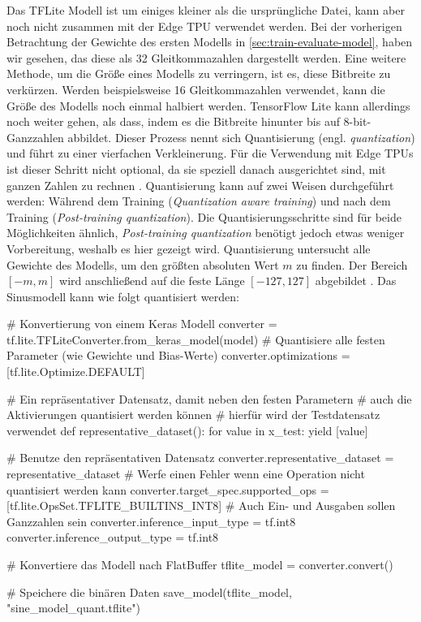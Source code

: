 Das TFLite Modell ist um einiges kleiner als die ursprüngliche Datei,
kann aber noch nicht zusammen mit der Edge TPU verwendet werden.
Bei der vorherigen Betrachtung der Gewichte des ersten Modells
in \autoref{sec:train-evaluate-model}, haben wir gesehen, das
diese als \qty{32}{\bit} Gleitkommazahlen dargestellt werden.
Eine weitere Methode, um die Größe eines Modells zu verringern,
ist es, diese Bitbreite zu verkürzen.
Werden beispielsweise \qty{16}{\bit} Gleitkommazahlen verwendet,
kann die Größe des Modells noch einmal halbiert werden.
TensorFlow Lite kann allerdings noch weiter gehen, als dass, indem es die
Bitbreite hinunter bis auf 8-bit-Ganzzahlen abbildet.
Dieser Prozess nennt sich Quantisierung
(engl. \textit{quantization}) und führt zu einer vierfachen Verkleinerung.
Für die Verwendung mit Edge TPUs ist dieser Schritt nicht optional,
da sie speziell danach ausgerichtet sind,
mit ganzen Zahlen zu rechnen \parencite{online:models-on-edge-tpu}.
Quantisierung kann auf zwei Weisen durchgeführt werden:
Während dem Training (\textit{Quantization aware training})
und nach dem Training (\textit{Post-training quantization}).
Die Quantisierungsschritte sind für beide Möglichkeiten ähnlich,
\textit{Post-training quantization} benötigt jedoch etwas weniger Vorbereitung,
weshalb es hier gezeigt wird.
Quantisierung untersucht alle Gewichte des Modells, um
den größten absoluten Wert $m$ zu finden. Der Bereich $[-m,m]$
wird anschließend auf die feste Länge $[-127,127]$
abgebildet \parencite[686]{book:hands-on-ml}.
Das Sinusmodell kann wie folgt quantisiert werden:
\begin{pythoncode}
# Konvertierung von einem Keras Modell
converter = tf.lite.TFLiteConverter.from_keras_model(model)
# Quantisiere alle festen Parameter (wie Gewichte und Bias-Werte)
converter.optimizations = [tf.lite.Optimize.DEFAULT]

# Ein repräsentativer Datensatz, damit neben den festen Parametern
# auch die Aktivierungen quantisiert werden können
# hierfür wird der Testdatensatz verwendet
def representative_dataset():
    for value in x_test:
        yield [value]

# Benutze den repräsentativen Datensatz
converter.representative_dataset = representative_dataset
# Werfe einen Fehler wenn eine Operation nicht quantisiert werden kann
converter.target_spec.supported_ops = [tf.lite.OpsSet.TFLITE_BUILTINS_INT8]
# Auch Ein- und Ausgaben sollen Ganzzahlen sein
converter.inference_input_type = tf.int8
converter.inference_output_type = tf.int8

# Konvertiere das Modell nach FlatBuffer
tflite_model = converter.convert()

# Speichere die binären Daten
save_model(tflite_model, "sine_model_quant.tflite")
\end{pythoncode}
